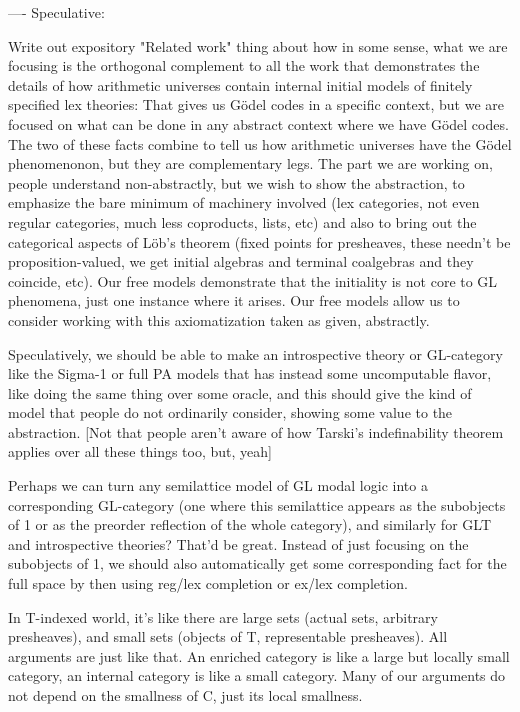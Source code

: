 ----
Speculative:

Write out expository "Related work" thing about how in some sense, what we are focusing is the orthogonal complement to all the work that demonstrates the details of how arithmetic universes contain internal initial models of finitely specified lex theories: That gives us Gödel codes in a specific context, but we are focused on what can be done in any abstract context where we have Gödel codes. The two of these facts combine to tell us how arithmetic universes have the Gödel phenomenonon, but they are complementary legs. The part we are working on, people understand non-abstractly, but we wish to show the abstraction, to emphasize the bare minimum of machinery involved (lex categories, not even regular categories, much less coproducts, lists, etc) and also to bring out the categorical aspects of Löb's theorem (fixed points for presheaves, these needn't be proposition-valued, we get initial algebras and terminal coalgebras and they coincide, etc). Our free models demonstrate that the initiality is not core to GL phenomena, just one instance where it arises. Our free models allow us to consider working with this axiomatization taken as given, abstractly.

Speculatively, we should be able to make an introspective theory or GL-category like the Sigma-1 or full PA models that has instead some uncomputable flavor, like doing the same thing over some oracle, and this should give the kind of model that people do not ordinarily consider, showing some value to the abstraction. [Not that people aren't aware of how Tarski's indefinability theorem applies over all these things too, but, yeah]

Perhaps we can turn any semilattice model of GL modal logic into a corresponding GL-category (one where this semilattice appears as the subobjects of 1 or as the preorder reflection of the whole category), and similarly for GLT and introspective theories? That'd be great. Instead of just focusing on the subobjects of 1, we should also automatically get some corresponding fact for the full space by then using reg/lex completion or ex/lex completion.

In T-indexed world, it's like there are large sets (actual sets, arbitrary presheaves), and small sets (objects of T, representable presheaves). All arguments are just like that. An enriched category is like a large but locally small category, an internal category is like a small category. Many of our arguments do not depend on the smallness of C, just its local smallness.